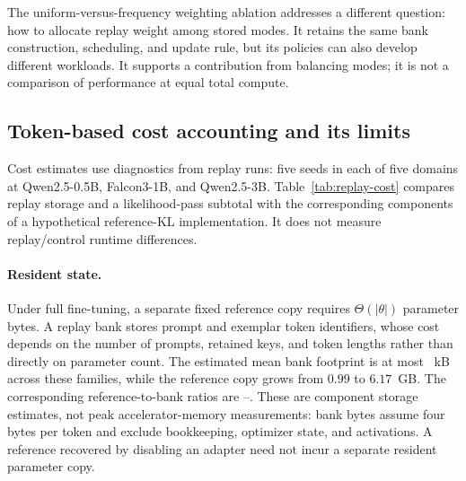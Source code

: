 \documentclass{article}
\newcommand{\1}{\mathbf 1}
\theoremstyle{remark}
\theoremstyle{definition}
\theoremstyle{plain}
\begin{document}
The uniform-versus-frequency weighting ablation addresses a different
question: how to allocate replay weight among stored modes. It retains the
same bank construction, scheduling, and update rule, but its policies can
also develop different workloads. It supports a contribution from balancing
modes; it is not a comparison of performance at equal total compute.

\subsection{Token-based cost accounting and its limits}
\label{app:compute-accounting}

Cost estimates use diagnostics from \MDcostRuns{} replay runs: five seeds
in each of five domains at Qwen2.5-0.5B, Falcon3-1B, and Qwen2.5-3B.
Table~\ref{tab:replay-cost} compares replay storage and a likelihood-pass
subtotal with the corresponding components of a hypothetical reference-KL
implementation. It does not measure replay/control runtime differences.

\paragraph{Resident state.}
Under full fine-tuning, a separate fixed reference copy requires
$\Theta(|\theta|)$ parameter bytes. A replay bank stores prompt and exemplar
token identifiers, whose cost depends on the number of prompts, retained
keys, and token lengths rather than directly on parameter count. The
estimated mean bank footprint is at most \MDcostBankKB{}~kB across these
families, while the reference copy grows from $0.99$ to $6.17$~GB. The
corresponding reference-to-bank ratios are \MDcostStateMin{}--\MDcostStateMax{}.
These are component storage estimates, not peak accelerator-memory
measurements: bank bytes assume four bytes per token and exclude bookkeeping,
optimizer state, and activations. A reference recovered by disabling an
adapter need not incur a separate resident parameter copy.
\end{document}
